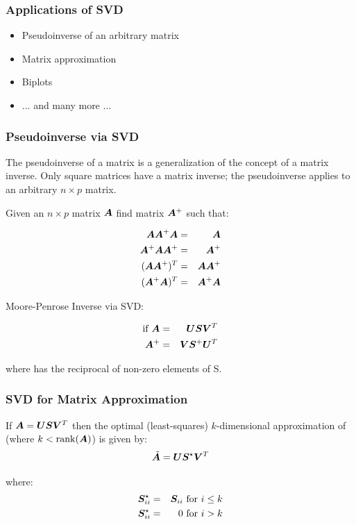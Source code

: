 \documentclass{beamer}
\DeclareMathOperator{\rank}{rank}
\begin{document}
\begin{frame}
  \frametitle{Applications of SVD}

\begin{itemize}
\item Pseudoinverse of an arbitrary matrix
\item Matrix approximation
\item Biplots
\item ... and many more ...
\end{itemize}

\end{frame}


\begin{frame}
  \frametitle{Pseudoinverse via SVD}

The pseudoinverse of a matrix is a generalization of the concept of a matrix inverse. Only square matrices have a matrix inverse; the pseudoinverse applies to an arbitrary $n \times p$ matrix.

\smallskip
Given an $n \times p$ matrix $\bm{A}$ find matrix $\bm{A}^{+}$ such that:

\begin{eqnarray*}
\bm{A} \bm{A}^{+} \bm{A} & = & \bm{A} \\
\bm{A}^{+} \bm{A} \bm{A}^{+} & = & \bm{A}^{+}\\
(\bm{A} \bm{A}^{+})^T & = & \bm{A} \bm{A}^{+}\\
(\bm{A}^{+} \bm{A})^T & = & \bm{A}^{+} \bm{A}
\end{eqnarray*}

\smallskip
Moore-Penrose Inverse via SVD:

\begin{eqnarray*}
\text{if}\ \bm{A} &=& \bm{U}\bm{S}\bm{V}^T \\
\bm{A}^{+} &=& \bm{V} \bm{S}^{+}  \bm{U}^T
\end{eqnarray*}

where  has the reciprocal of non-zero elements of S.

\end{frame}

\begin{frame}
  \frametitle{SVD for Matrix Approximation}

If $ \bm{A} = \bm{U} \bm{S} \bm{V}^T $
then the optimal (least-squares) $k$-dimensional approximation of  (where $ k < \rank(\Mtx{A})$) is given by:
\[
\tilde{\bm{A}} = \bm{U}\bm{S}^{\star} \bm{V}^T
\]

where:
\begin{eqnarray*}
\bm{S}_{ii}^{\star} &=& \bm{S}_{ii} \text{ for } i \leq k\\
\bm{S}_{ii}^{\star} &=& 0 \text{ for } i > k\\
\end{eqnarray*}

\end{frame}
\end{document}
